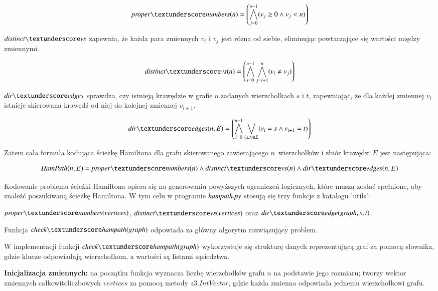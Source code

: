 \begin{align*}
	\propernumbers(n) = \left( \bigwedge_{j=0}^{n-1} (v_j \geq 0 \land v_j < n) \right) 
\end{align*}

$\distinctvs$ zapewnia, że każda para zmiennych \(v_i\) i \(v_j\) jest różna od siebie, eliminując powtarzające się wartości między zmiennymi.

\begin{align*}
	\distinctvs(n) = \left( \bigwedge_{i=0}^{n-1} \bigwedge_{j=i+1}^{n} (v_i \neq v_j) \right)
\end{align*}

$\diredges$ sprawdza, czy istnieją krawędzie w grafie o zadanych wierzchołkach \(s\) i \(t\), zapewniając, że dla każdej zmiennej \(v_i\) istnieje skierowana krawędź od niej do kolejnej zmiennej \(v_{i+1}\).​

\begin{align*}
	\diredges(n, E) = \left( \bigwedge_{i=0}^{n-1} \bigvee_{(s,t) \in E} (v_i = s \land v_{i+1} = t) \right)
\end{align*}

\vspace{1cm}

Zatem cała formuła kodująca ścieżkę Hamiltona dla grafu skierowanego zawierającego \(n\)~wierzchołków i zbiór krawędzi \(E\) jest następująca:

\begin{align*}
	\HamPath(n, E) = \propernumbers(n) \land \distinctvs(n) \land \diredges(n, E)
\end{align*}

Kodowanie problemu ścieżki Hamiltona opiera się na generowaniu powyższych ograniczeń logicznych, które muszą zostać spełnione, aby znaleźć poszukiwaną ścieżkę Hamiltona. W tym celu w programie ${\mathit{hampath.py}}$ stosują się trzy funkcje z katalogu 'utils': 

$\propernumbers \mli{(vertices)}$, $\distinctvs \mli{(vertices)}$ oraz $\diredge$. 

Funkcja $\checkhampath$ odpowiada za główny algorytm rozwiązujący problem.

W implementacji funkcji $\checkhampath$ wykorzystuje się strukturę danych reprezentującą graf za pomocą słownika, gdzie klucze odpowiadają wierzchołkom, a wartości są listami sąsiedztwa.

\textbf{Inicjalizacja zmiennych: } na początku funkcja wyznacza liczbę wierzchołków grafu $n$ na podstawie jego rozmiaru; tworzy wektor zmiennych całkowitoliczbowych $vertices$ za pomocą metody $z3.IntVector$, gdzie każda zmienna odpowiada jednemu wierzchołkowi grafu.
	

